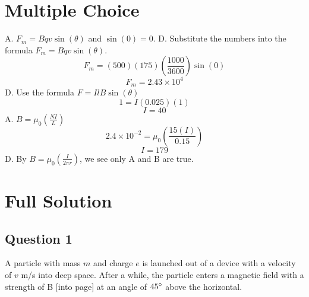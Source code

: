 \documentclass[letter,12pt]{exam}
\begin{document}
\begin{center}
\end{center}

\section{Multiple Choice}

\begin{questions}
	\question A. $F_m=Bqv\sin(\theta)$ and $\sin(0)=0$.
	\question D. Substitute the numbers into the formula $F_m=Bqv\sin(\theta)$.
		$$F_m=(500)(175)(\frac{1000}{3600})\sin(0)$$
		$$F_m=2.43\times10^4$$
	\question D. Use the formula $F=IlB\sin(\theta)$
		$$1=I(0.025)(1)$$
		$$I=40$$
	\question A. $B=\mu_0(\frac{NI}{L})$
		$$2.4 \times 10^{-2}=\mu_0(\frac{15(I)}{0.15})$$
		$$I=179$$
	\question D. By $B=\mu_0(\frac{I}{2\pi r})$, we see only A and B are true.
		
\end{questions}

\section{Full Solution}

\subsection{Question 1}

A particle with mass $m$ and charge $e$ is launched out of a device with a velocity of $v$ m/s into deep space. After a while, the particle enters a magnetic field with a strength of B [into page] at an angle of $45 \degree$ above the horizontal.
\end{document}
